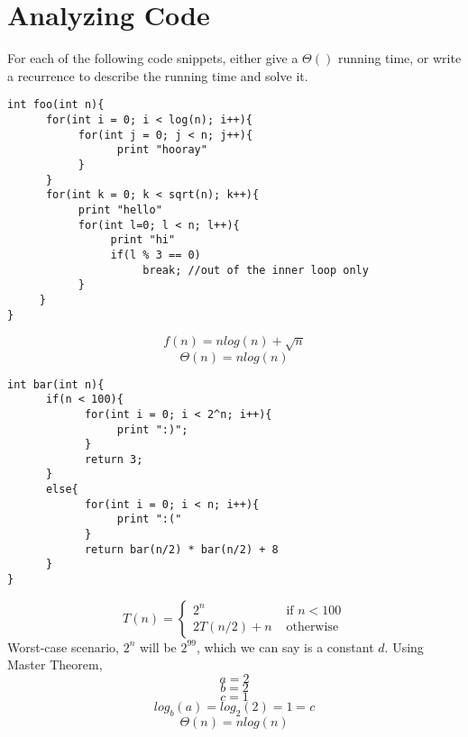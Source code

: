 \documentclass[12pt]{article}
\begin{document}
\section{Analyzing Code}
For each of the following code snippets, either give a $\Theta()$ running time, or write a recurrence to describe the running time and solve it.

\begin{verbatim}
int foo(int n){
      for(int i = 0; i < log(n); i++){
           for(int j = 0; j < n; j++){
                 print "hooray"
           }
      }
      for(int k = 0; k < sqrt(n); k++){
           print "hello"
           for(int l=0; l < n; l++){
                print "hi"
                if(l % 3 == 0)
                     break; //out of the inner loop only
           }
     }
}
\end{verbatim}
\begin{tcolorbox}
$$f(n)=nlog(n)+\sqrt{n}$$
$$\Theta(n)=nlog(n)$$
\end{tcolorbox}

\begin{verbatim}
int bar(int n){
      if(n < 100){
            for(int i = 0; i < 2^n; i++){
                 print ":)";
            }
            return 3;
      }
      else{
            for(int i = 0; i < n; i++){
                 print ":("
            }
            return bar(n/2) * bar(n/2) + 8
      }
}
\end{verbatim}
\begin{tcolorbox}
\[ T(n) = \begin{cases} 2^n &\text{ if } n < 100\\
		2T(n/2) + n &\text{ otherwise} \end{cases} \]
Worst-case scenario, $2^n$ will be $2^{99}$, which we can say is a constant $d$. Using Master Theorem,
\[a=2\]
\[b=2\]
\[c=1\]
\[log_b(a)=log_2(2)=1=c\]
\[\Theta(n)=nlog(n)\]
\end{tcolorbox}
\end{document}
